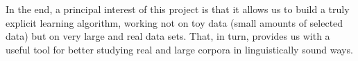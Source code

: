 \documentclass[output=paper,colorlinks,citecolor=brown]{langscibook}
\begin{document}
In the end, a principal interest of this project is that it allows us to build a truly explicit learning algorithm, working not on toy data (small amounts of selected data) but on very large and real data sets. That, in turn, provides us with a useful tool for better studying real and large corpora in linguistically sound ways. 










 

{\sloppy\printbibliography[heading=subbibliography,notkeyword=this]}
\end{document}
